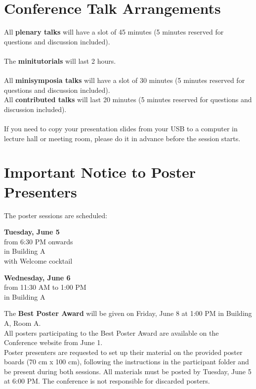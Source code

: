 
\section*{Conference Talk Arrangements}

All \textbf{plenary talks} will have a slot of 45 minutes
(5 minutes reserved for questions and discussion included).\\\\
The \textbf{minitutorials} will last 2 hours.\\\\
All \textbf{minisymposia talks} will have a slot of 30 minutes (5 minutes reserved for questions and discussion included).\\
All \textbf{contributed talks} will last 20 minutes (5 minutes reserved for questions and discussion included).\\\\
If you need to copy your presentation slides from your USB to a computer in lecture hall or meeting room, please do it in advance before
the session starts.

\section*{Important Notice to Poster Presenters}

The poster sessions are scheduled:
\begin{center}
  \textbf{Tuesday, June 5} \\
  from 6:30 PM onwards \\
  in Building A\\
  with Welcome cocktail

  \bigskip
   
  \textbf{Wednesday, June 6} \\
  from 11:30 AM to 1:00 PM \\
  in Building A
\end{center}

\noindent The \textbf{Best Poster Award} will be given on Friday, June 8 at 1:00 PM in Building A, Room A.\\

\noindent All posters participating to the Best Poster Award are available on the Conference website from June 1.\\
Poster presenters are requested to set up
their material on the provided poster boards (70 cm x 100 cm), following the instructions in the participant folder and be present during both sessions.  
All materials must
be posted by Tuesday, June 5 at
6:00 PM.
The conference is not responsible for
discarded posters.

